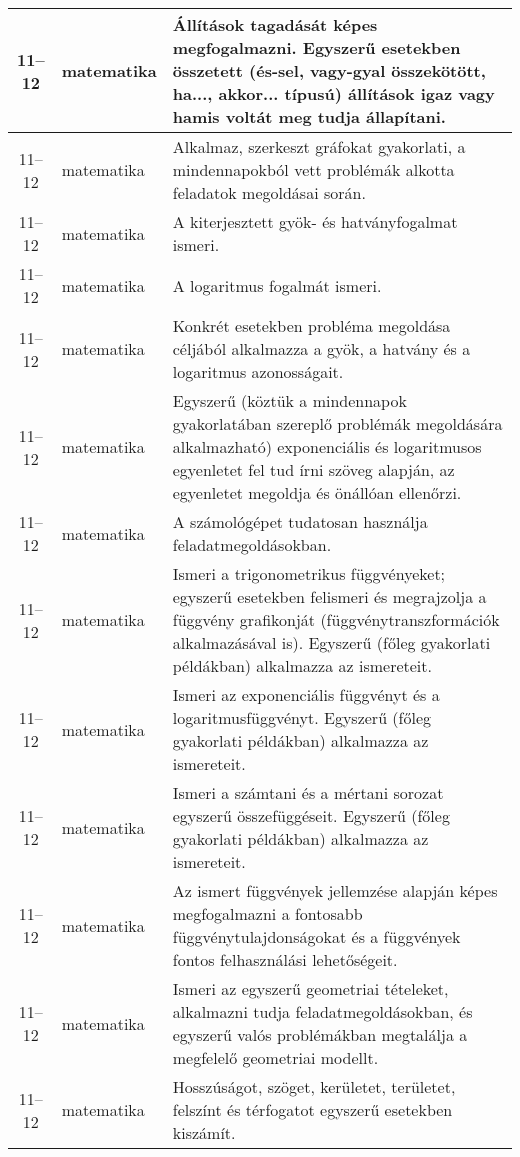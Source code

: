 \begin{small}
\begin{longtable}{c | p{2cm} |  p{11cm} }
              11--12 & matematika & Állítások tagadását képes megfogalmazni. Egyszerű esetekben összetett (és-sel, vagy-gyal összekötött, ha..., akkor... típusú) állítások igaz vagy hamis voltát meg tudja állapítani. \\ \hline
              11--12 & matematika & Alkalmaz, szerkeszt gráfokat gyakorlati, a mindennapokból vett problémák alkotta feladatok megoldásai során. \\ \hline
              11--12 & matematika & A kiterjesztett gyök- és hatványfogalmat ismeri. \\ \hline
              11--12 & matematika & A logaritmus fogalmát ismeri. \\ \hline
              11--12 & matematika & Konkrét esetekben probléma megoldása céljából  alkalmazza a gyök, a hatvány és a logaritmus azonosságait. \\ \hline
              11--12 & matematika & Egyszerű (köztük a mindennapok gyakorlatában szereplő problémák megoldására alkalmazható) exponenciális és logaritmusos egyenletet fel tud írni szöveg alapján, az egyenletet megoldja és önállóan ellenőrzi. \\ \hline
              11--12 & matematika & A számológépet tudatosan használja feladatmegoldásokban. \\ \hline
              11--12 & matematika & Ismeri a trigonometrikus függvényeket; egyszerű esetekben felismeri és megrajzolja a függvény grafikonját (függvénytranszformációk alkalmazásával is). Egyszerű (főleg gyakorlati példákban) alkalmazza az ismereteit. \\ \hline
              11--12 & matematika & Ismeri az exponenciális függvényt és a logaritmusfüggvényt. Egyszerű (főleg gyakorlati példákban) alkalmazza az ismereteit. \\ \hline
              11--12 & matematika & Ismeri a számtani és a mértani sorozat egyszerű összefüggéseit. Egyszerű (főleg gyakorlati példákban) alkalmazza az ismereteit. \\ \hline
              11--12 & matematika & Az ismert függvények jellemzése alapján képes megfogalmazni a fontosabb függvénytulajdonságokat és a függvények fontos felhasználási lehetőségeit. \\ \hline
              11--12 & matematika & Ismeri az egyszerű geometriai tételeket, alkalmazni tudja feladatmegoldásokban, és egyszerű valós problémákban megtalálja a megfelelő geometriai modellt. \\ \hline
              11--12 & matematika & Hosszúságot, szöget, kerületet, területet, felszínt és térfogatot egyszerű esetekben kiszámít. \\ \hline

\end{longtable}
\end{small}
